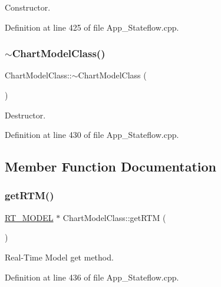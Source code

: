 Constructor. 



Definition at line 425 of file App\+\_\+\+Stateflow.\+cpp.

\mbox{\label{class_chart_model_class_a7b8440da4a5cbe07a6b0433db9a69f99}} 
\subsubsection{\texorpdfstring{$\sim$\+Chart\+Model\+Class()}{~ChartModelClass()}}
{\footnotesize\ttfamily Chart\+Model\+Class\+::$\sim$\+Chart\+Model\+Class (\begin{DoxyParamCaption}{ }\end{DoxyParamCaption})}



Destructor. 



Definition at line 430 of file App\+\_\+\+Stateflow.\+cpp.



\subsection{Member Function Documentation}
\mbox{\label{class_chart_model_class_a77ef9eda8f1e119f93ad3c87b3a54bbd}} 
\subsubsection{\texorpdfstring{get\+R\+T\+M()}{getRTM()}}
{\footnotesize\ttfamily \mbox{\hyperlink{_app___stateflow_8h_a6f32dbbab0d15102b3fe6ec3fe6a72ba}{R\+T\+\_\+\+M\+O\+D\+EL}} $\ast$ Chart\+Model\+Class\+::get\+R\+TM (\begin{DoxyParamCaption}{ }\end{DoxyParamCaption})}



Real-\/\+Time Model get method. 



Definition at line 436 of file App\+\_\+\+Stateflow.\+cpp.

